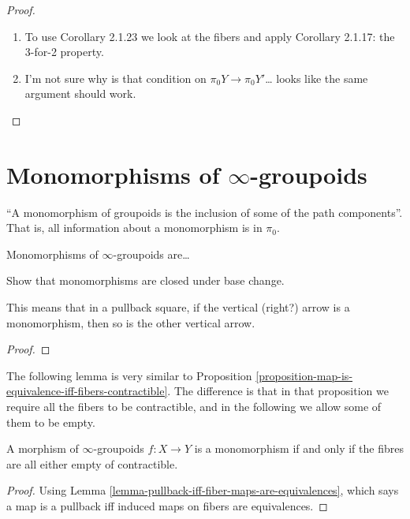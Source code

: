 \begin{proof}
\begin{enumerate}
\item To use Corollary 2.1.23 we look at the fibers and apply
 Corollary 2.1.17: the 3-for-2 property.
\item I'm not sure why is that condition on
$\pi_0Y \to \pi_0Y'$… looks like the same argument should work.
\end{enumerate}
\end{proof}

\section{Monomorphisms of $\infty$-groupoids}
\label{section-monomorphisms}

\noindent
``A monomorphism of groupoids is the inclusion of
some of the path components''. That is, all information
about a monomorphism is in $\pi_0$.

Monomorphisms of $\infty$-groupoids are…

\begin{exercise}[2.6]
\label{exercise-2.6}
Show that monomorphisms are closed
under base change.
\end{exercise}

This means that in a pullback square,
if the vertical (right?) arrow
is a monomorphism, then so is the
other vertical arrow.

\begin{proof}

\end{proof}

\noindent
The following lemma is very similar to
Proposition \ref{proposition-map-is-equivalence-iff-fibers-contractible}.
The difference is that in that proposition we
require all the fibers to be contractible,
and in the following we allow some of them to be empty.

\begin{lemma}
\label{lemma-monomorphism-iff-fibres-are-empty-or-contractible}
A morphism of $\infty$-groupoids $f:X \to Y$ is
a monomorphism if and only if the fibres are all
either empty of contractible.
\end{lemma}

\begin{proof}
Using Lemma \ref{lemma-pullback-iff-fiber-maps-are-equivalences},
which says a map is a pullback iff induced maps on fibers are equivalences.
\end{proof}

